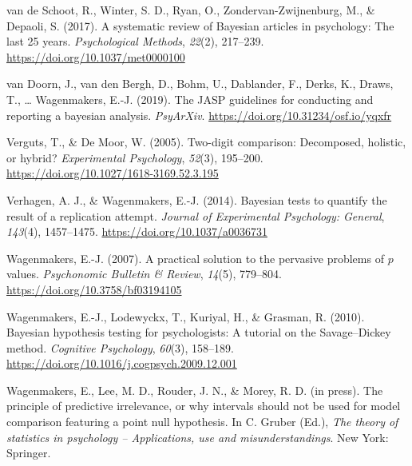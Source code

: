 \documentclass[english,,doc,floatsintext]{apa6}
\begin{document}
\leavevmode\hypertarget{ref-vandeschoot2017systematic}{}%
van de Schoot, R., Winter, S. D., Ryan, O., Zondervan-Zwijnenburg, M., \& Depaoli, S. (2017). A systematic review of Bayesian articles in psychology: The last 25 years. \emph{Psychological Methods}, \emph{22}(2), 217--239. \url{https://doi.org/10.1037/met0000100}

\leavevmode\hypertarget{ref-doorn2019jaspguidelines}{}%
van Doorn, J., van den Bergh, D., Bohm, U., Dablander, F., Derks, K., Draws, T., \ldots{} Wagenmakers, E.-J. (2019). The JASP guidelines for conducting and reporting a bayesian analysis. \emph{PsyArXiv}. \url{https://doi.org/10.31234/osf.io/yqxfr}

\leavevmode\hypertarget{ref-vergutsDeMoor2005}{}%
Verguts, T., \& De Moor, W. (2005). Two-digit comparison: Decomposed, holistic, or hybrid? \emph{Experimental Psychology}, \emph{52}(3), 195--200. \url{https://doi.org/10.1027/1618-3169.52.3.195}

\leavevmode\hypertarget{ref-verhagen14bayesian}{}%
Verhagen, A. J., \& Wagenmakers, E.-J. (2014). Bayesian tests to quantify the result of a replication attempt. \emph{Journal of Experimental Psychology: General}, \emph{143}(4), 1457--1475. \url{https://doi.org/10.1037/a0036731}

\leavevmode\hypertarget{ref-wagenmakers2007}{}%
Wagenmakers, E.-J. (2007). A practical solution to the pervasive problems of \(p\) values. \emph{Psychonomic Bulletin \& Review}, \emph{14}(5), 779--804. \url{https://doi.org/10.3758/bf03194105}

\leavevmode\hypertarget{ref-wagenmakers2010}{}%
Wagenmakers, E.-J., Lodewyckx, T., Kuriyal, H., \& Grasman, R. (2010). Bayesian hypothesis testing for psychologists: A tutorial on the Savage--Dickey method. \emph{Cognitive Psychology}, \emph{60}(3), 158--189. \url{https://doi.org/10.1016/j.cogpsych.2009.12.001}

\leavevmode\hypertarget{ref-WagenmakersEtAlPredictiveIrrelevancesubm}{}%
Wagenmakers, E., Lee, M. D., Rouder, J. N., \& Morey, R. D. (in press). The principle of predictive irrelevance, or why intervals should not be used for model comparison featuring a point null hypothesis. In C. Gruber (Ed.), \emph{The theory of statistics in psychology -- Applications, use and misunderstandings}. New York: Springer.
\end{document}
